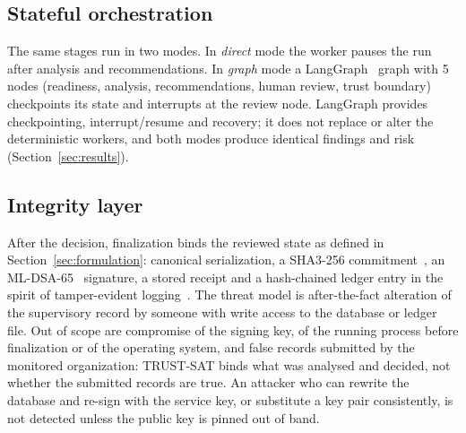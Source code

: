 \subsection{Stateful orchestration}
The same stages run in two modes. In \emph{direct} mode the worker pauses the run after
analysis and recommendations. In \emph{graph} mode a LangGraph~\cite{langgraph2026docs}
graph with 5 nodes (readiness, analysis, recommendations, human
review, trust boundary) checkpoints its state and interrupts at the review node.
LangGraph provides checkpointing, interrupt/resume and recovery; it does not replace or
alter the deterministic workers, and both modes produce identical findings and risk
(Section~\ref{sec:results}).

\subsection{Integrity layer}
After the decision, finalization binds the reviewed state as defined in
Section~\ref{sec:formulation}: canonical serialization, a SHA3-256
commitment~\cite{nist2015fips202}, an ML-DSA-65~\cite{nist2024fips204}
signature, a stored receipt and a hash-chained ledger entry in the spirit of
tamper-evident logging~\cite{schneier1999logs,crosby2009logging}. The threat model is
after-the-fact alteration of the supervisory record by someone with write access to
the database or ledger file. Out of scope are compromise of the signing key, of the
running process before finalization or of the operating system, and false records
submitted by the monitored organization: TRUST-SAT binds what was analysed and
decided, not whether the submitted records are true. An attacker who can rewrite the
database and re-sign with the service key, or substitute a key pair consistently, is
not detected unless the public key is pinned out of band.
